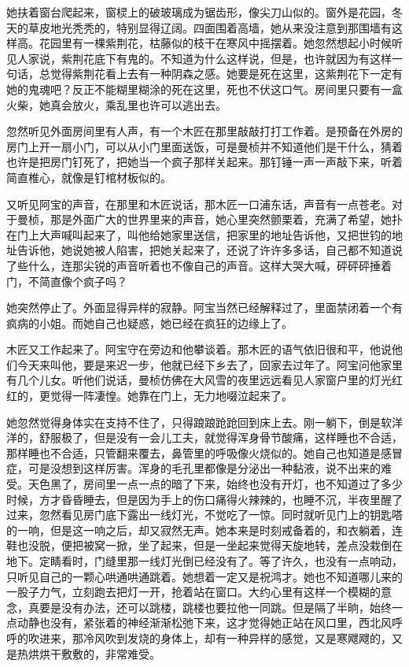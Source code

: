 \par 她扶着窗台爬起来，窗棂上的破玻璃成为锯齿形，像尖刀山似的。窗外是花园，冬天的草皮地光秃秃的，特别显得辽阔。四面围着高墙，她从来没注意到那围墙有这样高。花园里有一棵紫荆花，枯藤似的枝干在寒风中摇摆着。她忽然想起小时候听见人家说，紫荆花底下有鬼的。不知道为什么这样说，但是，也许就因为有这样一句话，总觉得紫荆花看上去有一种阴森之感。她要是死在这里，这紫荆花下一定有她的鬼魂吧？反正不能糊里糊涂的死在这里，死也不伏这口气。房间里只要有一盒火柴，她真会放火，乘乱里也许可以逃出去。
\par 忽然听见外面房间里有人声，有一个木匠在那里敲敲打打工作着。是预备在外房的房门上开一扇小门，可以从小门里面送饭，可是曼桢并不知道他们是干什么，猜着也许是把房门钉死了，把她当一个疯子那样关起来。那钉锤一声一声敲下来，听着简直椎心，就像是钉棺材板似的。
\par 又听见阿宝的声音，在那里和木匠说话，那木匠一口浦东话，声音有一点苍老。对于曼桢，那是外面广大的世界里来的声音，她心里突然颤栗着，充满了希望，她扑在门上大声喊叫起来了，叫他给她家里送信，把家里的地址告诉他，又把世钧的地址告诉他，她说她被人陷害，把她关起来了，还说了许许多多话，自己都不知道说了些什么，连那尖锐的声音听着也不像自己的声音。这样大哭大喊，砰砰砰捶着门，不简直像个疯子吗？
\par 她突然停止了。外面显得异样的寂静。阿宝当然已经解释过了，里面禁闭着一个有疯病的小姐。而她自己也疑惑，她已经在疯狂的边缘上了。
\par 木匠又工作起来了。阿宝守在旁边和他攀谈着。那木匠的语气依旧很和平，他说他们今天来叫他，要是来迟一步，他就已经下乡去了，回家去过年了。阿宝问他家里有几个儿女。听他们说话，曼桢仿佛在大风雪的夜里远远看见人家窗户里的灯光红红的，更觉得一阵凄惶。她靠在门上，无力地啜泣起来了。
\par 她忽然觉得身体实在支持不住了，只得踉踉跄跄回到床上去。刚一躺下，倒是软洋洋的，舒服极了，但是没有一会儿工夫，就觉得浑身骨节酸痛，这样睡也不合适，那样睡也不合适，只管翻来覆去，鼻管里的呼吸像火烧似的。她自己也知道是感冒症，可是没想到这样厉害。浑身的毛孔里都像是分泌出一种黏液，说不出来的难受。天色黑了，房间里一点一点的暗了下来，始终也没有开灯，也不知道过了多少时候，方才昏昏睡去，但是因为手上的伤口痛得火辣辣的，也睡不沉，半夜里醒了过来，忽然看见房门底下露出一线灯光，不觉吃了一惊。同时就听见门上的钥匙嗒的一响，但是这一响之后，却又寂然无声。她本来是时刻戒备着的，和衣躺着，连鞋也没脱，便把被窝一掀，坐了起来，但是一坐起来觉得天旋地转，差点没栽倒在地下。定睛看时，门缝里那一线灯光倒已经没有了。等了许久，也没有一点响动，只听见自己的一颗心哄通哄通跳着。她想着一定又是祝鸿才。她也不知道哪儿来的一股子力气，立刻跑去把灯一开，抢着站在窗口。大约心里有这样一个模糊的意念，真要是没有办法，还可以跳楼，跳楼也要拉他一同跳。但是隔了半晌，始终一点动静也没有，紧张着的神经渐渐松弛下来，这才觉得她正站在风口里，西北风呼呼的吹进来，那冷风吹到发烧的身体上，却有一种异样的感觉，又是寒飕飕的，又是热烘烘干敷敷的，非常难受。
